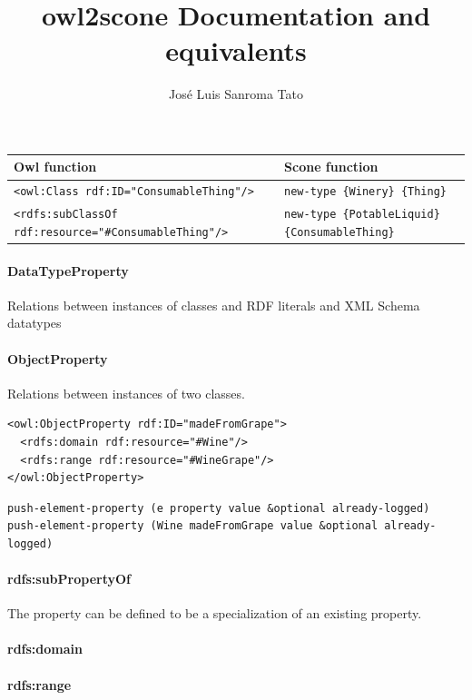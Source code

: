 \documentclass[a4paper, 10pt]{article}
\title{owl2scone Documentation and equivalents}
\author{José Luis Sanroma Tato}
\begin{document}
\maketitle

\begin{center}
  \begin{tabular}{| l | l |}
    \hline
    \textbf{Owl function} & \textbf{Scone function} \\ \hline
    \verb|<owl:Class rdf:ID="ConsumableThing"/>| & \verb|new-type {Winery} {Thing}| \\ \hline
    \verb|<rdfs:subClassOf rdf:resource="#ConsumableThing"/>| & \verb|new-type {PotableLiquid} {ConsumableThing}| \\ \hline


  \end{tabular}
\end{center}


\paragraph{DataTypeProperty}
\label{sec:datatypeproperty}

Relations between instances of classes and RDF literals and XML Schema
datatypes

\paragraph{ObjectProperty}
\label{sec:objectproperty}
Relations between instances of two classes.

\begin{verbatim}
<owl:ObjectProperty rdf:ID="madeFromGrape">
  <rdfs:domain rdf:resource="#Wine"/>
  <rdfs:range rdf:resource="#WineGrape"/>
</owl:ObjectProperty>
\end{verbatim}

\begin{verbatim}
push-element-property (e property value &optional already-logged)
push-element-property (Wine madeFromGrape value &optional already-logged)
\end{verbatim}




\paragraph{rdfs:subPropertyOf}
\label{sec:rdfs:subpropertyof}
The property can be defined to be a specialization of an existing
property.

\paragraph{rdfs:domain}
\label{sec:rdfs:domain}

\paragraph{rdfs:range}
\label{sec:rdfs:range}
\end{document}
